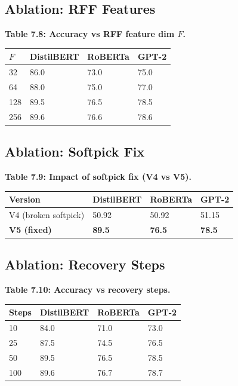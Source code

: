 \subsection{Ablation: RFF Features}

\textbf{Table 7.8: Accuracy vs RFF feature dim $F$.}

\begin{table}[H]
\centering
\small
\begin{tabular}{llll}
\toprule
\textbf{$F$} & \textbf{DistilBERT} & \textbf{RoBERTa} & \textbf{GPT-2} \\
\midrule
32 & 86.0 & 73.0 & 75.0 \\
64 & 88.0 & 75.0 & 77.0 \\
128 & 89.5 & 76.5 & 78.5 \\
256 & 89.6 & 76.6 & 78.6 \\
\bottomrule
\end{tabular}
\end{table}

\subsection{Ablation: Softpick Fix}

\textbf{Table 7.9: Impact of softpick fix (V4 vs V5).}

\begin{table}[H]
\centering
\small
\begin{tabular}{llll}
\toprule
\textbf{Version} & \textbf{DistilBERT} & \textbf{RoBERTa} & \textbf{GPT-2} \\
\midrule
V4 (broken softpick) & 50.92 & 50.92 & 51.15 \\
\textbf{V5 (fixed)} & \textbf{89.5} & \textbf{76.5} & \textbf{78.5} \\
\bottomrule
\end{tabular}
\end{table}

\subsection{Ablation: Recovery Steps}

\textbf{Table 7.10: Accuracy vs recovery steps.}

\begin{table}[H]
\centering
\small
\begin{tabular}{llll}
\toprule
\textbf{Steps} & \textbf{DistilBERT} & \textbf{RoBERTa} & \textbf{GPT-2} \\
\midrule
10 & 84.0 & 71.0 & 73.0 \\
25 & 87.5 & 74.5 & 76.5 \\
50 & 89.5 & 76.5 & 78.5 \\
100 & 89.6 & 76.7 & 78.7 \\
\bottomrule
\end{tabular}
\end{table}

